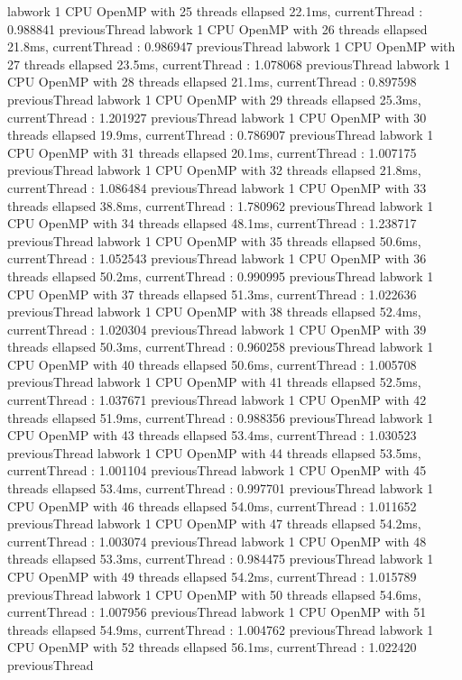labwork 1 CPU OpenMP with 25 threads ellapsed 22.1ms, currentThread : 0.988841 previousThread
labwork 1 CPU OpenMP with 26 threads ellapsed 21.8ms, currentThread : 0.986947 previousThread
labwork 1 CPU OpenMP with 27 threads ellapsed 23.5ms, currentThread : 1.078068 previousThread
labwork 1 CPU OpenMP with 28 threads ellapsed 21.1ms, currentThread : 0.897598 previousThread
labwork 1 CPU OpenMP with 29 threads ellapsed 25.3ms, currentThread : 1.201927 previousThread
labwork 1 CPU OpenMP with 30 threads ellapsed 19.9ms, currentThread : 0.786907 previousThread
labwork 1 CPU OpenMP with 31 threads ellapsed 20.1ms, currentThread : 1.007175 previousThread
labwork 1 CPU OpenMP with 32 threads ellapsed 21.8ms, currentThread : 1.086484 previousThread
labwork 1 CPU OpenMP with 33 threads ellapsed 38.8ms, currentThread : 1.780962 previousThread
labwork 1 CPU OpenMP with 34 threads ellapsed 48.1ms, currentThread : 1.238717 previousThread
labwork 1 CPU OpenMP with 35 threads ellapsed 50.6ms, currentThread : 1.052543 previousThread
labwork 1 CPU OpenMP with 36 threads ellapsed 50.2ms, currentThread : 0.990995 previousThread
labwork 1 CPU OpenMP with 37 threads ellapsed 51.3ms, currentThread : 1.022636 previousThread
labwork 1 CPU OpenMP with 38 threads ellapsed 52.4ms, currentThread : 1.020304 previousThread
labwork 1 CPU OpenMP with 39 threads ellapsed 50.3ms, currentThread : 0.960258 previousThread
labwork 1 CPU OpenMP with 40 threads ellapsed 50.6ms, currentThread : 1.005708 previousThread
labwork 1 CPU OpenMP with 41 threads ellapsed 52.5ms, currentThread : 1.037671 previousThread
labwork 1 CPU OpenMP with 42 threads ellapsed 51.9ms, currentThread : 0.988356 previousThread
labwork 1 CPU OpenMP with 43 threads ellapsed 53.4ms, currentThread : 1.030523 previousThread
labwork 1 CPU OpenMP with 44 threads ellapsed 53.5ms, currentThread : 1.001104 previousThread
labwork 1 CPU OpenMP with 45 threads ellapsed 53.4ms, currentThread : 0.997701 previousThread
labwork 1 CPU OpenMP with 46 threads ellapsed 54.0ms, currentThread : 1.011652 previousThread
labwork 1 CPU OpenMP with 47 threads ellapsed 54.2ms, currentThread : 1.003074 previousThread
labwork 1 CPU OpenMP with 48 threads ellapsed 53.3ms, currentThread : 0.984475 previousThread
labwork 1 CPU OpenMP with 49 threads ellapsed 54.2ms, currentThread : 1.015789 previousThread
labwork 1 CPU OpenMP with 50 threads ellapsed 54.6ms, currentThread : 1.007956 previousThread
labwork 1 CPU OpenMP with 51 threads ellapsed 54.9ms, currentThread : 1.004762 previousThread
labwork 1 CPU OpenMP with 52 threads ellapsed 56.1ms, currentThread : 1.022420 previousThread
